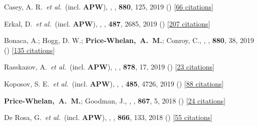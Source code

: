 \item[{\color{deemph}\scriptsize52}]Casey, A. R.~\textit{et al.}~(incl. \textbf{APW}), , \apj, \textbf{880}, 125, 2019 () [\href{http://adsabs.harvard.edu/abs/2019ApJ...880..125C}{66 citations}]

\item[{\color{deemph}\scriptsize51}]Erkal, D.~\textit{et al.}~(incl. \textbf{APW}), , \mnras, \textbf{487}, 2685, 2019 () [\href{http://adsabs.harvard.edu/abs/2019MNRAS.487.2685E}{207 citations}]

\item[{\color{deemph}\scriptsize50}]Bonaca, A.; Hogg, D. W.; \textbf{Price-Whelan,~A.~M.}; Conroy, C., , \apj, \textbf{880}, 38, 2019 () [\href{http://adsabs.harvard.edu/abs/2019ApJ...880...38B}{135 citations}]

\item[{\color{deemph}\scriptsize49}]Rasskazov, A.~\textit{et al.}~(incl. \textbf{APW}), , \apj, \textbf{878}, 17, 2019 () [\href{http://adsabs.harvard.edu/abs/2019ApJ...878...17R}{23 citations}]

\item[{\color{deemph}\scriptsize48}]Koposov, S. E.~\textit{et al.}~(incl. \textbf{APW}), , \mnras, \textbf{485}, 4726, 2019 () [\href{http://adsabs.harvard.edu/abs/2019MNRAS.485.4726K}{88 citations}]

\item[{\color{deemph}\scriptsize47}]\textbf{Price-Whelan,~A.~M.}; Goodman, J., , \apj, \textbf{867}, 5, 2018 () [\href{http://adsabs.harvard.edu/abs/2018ApJ...867....5P}{24 citations}]

\item[{\color{deemph}\scriptsize46}]De Rosa, G.~\textit{et al.}~(incl. \textbf{APW}), , \apj, \textbf{866}, 133, 2018 () [\href{http://adsabs.harvard.edu/abs/2018ApJ...866..133D}{55 citations}]


